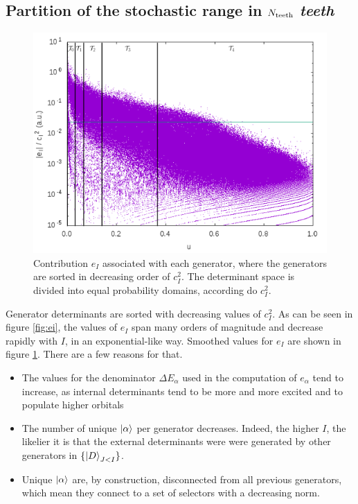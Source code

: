 \documentclass[./thesis.tex]{subfiles}
\begin{document}
\subsection{Partition of the stochastic range in $N_\text{teeth}$ \emph{teeth}}
\label{sec:partition}

\begin{figure}[h!]
	\begin{center}
		\includegraphics[width=0.9\columnwidth]{figures/pt2/eici2_comb}
	\end{center}
	\caption{Contribution $e_I$ associated with each generator, where the generators are sorted in decreasing order of $c_I^2$. The determinant space is divided into equal probability domains, according do $c_I^2$.}
	\label{fig:p_i}
\end{figure}

Generator determinants are sorted with decreasing values of $c_I^2$.
As can be seen in figure \ref{fig:ei}, the values of $e_I$ span many orders of magnitude and decrease rapidly with $I$, in an exponential-like way. Smoothed values for $e_I$ are shown in figure \ref{fig:p_i}. There are a few reasons for that.
\begin{itemize}
	\item
	The values for the denominator $\Delta E_\alpha$ used in the computation of $e_\alpha$ tend to increase, as internal determinants tend to be more and more excited and to populate higher orbitals 
	\item
	The number of unique $\ket \alpha$ per generator decreases. Indeed, the higher $I$, the likelier it is that the external determinants were were generated by other generators in $\{\ket{D}_{J<I}\}$.
	\item
	Unique $\ket \alpha$ are, by construction, disconnected from all previous generators, which mean they connect to a set of selectors with a decreasing norm.
\end{itemize}
\end{document}
